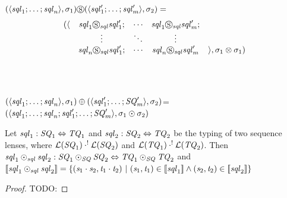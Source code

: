 \documentclass[numbers]{sigplanconf}
\begin{document}
\begin{definition}
\[\begin{array}{rcccl}
\end{array}
\]
\\
\\\SwapDNFLens{} \OfType{}
\ArrowTypeOf{\DNFLensType{}}{\ArrowTypeOf{\DNFLensType{}}{\DNFLensType{}}}\\
$(\langle\mathit{sql}_1;\ldots;\mathit{sql}_n\rangle,\sigma_1)\circledS(\langle\mathit{sql}_1';\ldots;\mathit{sql}_m'\rangle,\sigma_2)=$
\[
\begin{array}{rcccl}
(\langle & \mathit{sql}_1\circledS_{\mathit{sql}}\mathit{sql}_1'; & \cdots & \mathit{sql}_1\circledS_{\mathit{sql}}\mathit{sql}_m'; \\
& \vdots & \ddots & \vdots \\
& \mathit{sql}_n\circledS_{\mathit{sql}}\mathit{sql}_1'; & \cdots & \mathit{sql}_n\circledS_{\mathit{sql}}\mathit{sql}_m' & \rangle,\sigma_1\otimes\sigma_1)
\end{array}
\]
\\
\\\OrDNFLens{} \OfType{}
\ArrowTypeOf{\DNFLensType{}}{\ArrowTypeOf{\DNFLensType{}}{\DNFLensType{}}
}\\
$(\langle\mathit{sql}_1;\ldots;\mathit{sql}_n\rangle,\sigma_1)\oplus({\langle\mathit{sql}_1';\ldots;\mathit{SQ}_m'\rangle,\sigma_2)}$=\\
\hspace*{2ex}$(\langle\mathit{sql}_1;\ldots;\mathit{sql}_n;
  \mathit{sql}_1';\ldots;\mathit{SQ}_m'\rangle,\sigma_1\odot\sigma_2)$\\
\end{definition}

\begin{lemma}
  Let $\mathit{sql}_1 : \mathit{SQ}_1 \Leftrightarrow \mathit{TQ}_1$ and
  $\mathit{sql}_2 : \mathit{SQ}_2 \Leftrightarrow \mathit{TQ}_2$ be the typing of
  two sequence lenses, where
  $\mathcal{L}(\mathit{SQ}_1) \cdot^! \mathcal{L}(\mathit{SQ}_2)$ and
  $\mathcal{L}(\mathit{TQ}_1) \cdot^! \mathcal{L}(\mathit{TQ}_2)$.
  Then $\mathit{sql}_1\odot_{\mathit{sql}}\mathit{sql}_2 :
  \mathit{SQ}_1\odot_{\mathit{SQ}}\mathit{SQ}_2 \Leftrightarrow
  \mathit{TQ}_1\odot_{\mathit{SQ}}\mathit{TQ}_2$ and
  $[ \! [\mathit{sql}_1\odot_{\mathit{sql}}\mathit{sql}_2] \! ] =
  \{(\mathit{s}_1\cdot\mathit{s}_2,\mathit{t}_1\cdot\mathit{t}_2) ~|~
  (\mathit{s}_1,\mathit{t}_1)\in[ \! [\mathit{sql}_1] \! ]
  \wedge(\mathit{s}_2,\mathit{t}_2)\in[ \! [\mathit{sql}_2] \! ]\}$
\end{lemma}
\begin{proof}
  TODO:
\end{proof}
\end{document}
